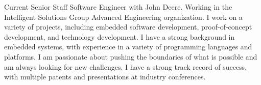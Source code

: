 

\begin{cvparagraph}

Current Senior Staff Software Engineer with John Deere. Working in the Intelligent Solutions Group Advanced Engineering organization.
I work on a variety of projects, including embedded software development, proof-of-concept development, and technology development.
I have a strong background in embedded systems, with experience in a variety of programming languages and platforms.
I am passionate about pushing the boundaries of what is possible and am always looking for new challenges.
I have a strong track record of success, with multiple patents and presentations at industry conferences.
\end{cvparagraph}
